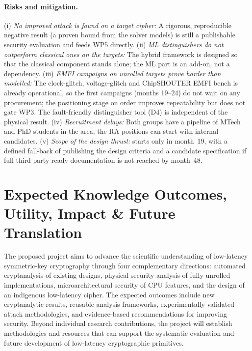 \paragraph{Risks and mitigation.}
(i) \emph{No improved attack is found on a target cipher:}
A rigorous, reproducible negative result (a proven bound from the solver models) is still a publishable security evaluation and feeds WP5 directly.
(ii) \emph{ML distinguishers do not outperform classical ones on the targets:}
The hybrid framework is designed so that the classical component stands alone; the ML part is an add-on, not a dependency.
(iii) \emph{EMFI campaigns on unrolled targets prove harder than modelled:}
The clock-glitch, voltage-glitch and ChipSHOUTER EMFI bench is already operational, so the first campaigns (months 19--24) do not wait on any procurement; the positioning stage on order improves repeatability but does not gate WP3. The fault-friendly distinguisher tool (D4) is independent of the physical result.
(iv) \emph{Recruitment delays:}
Both groups have a pipeline of MTech and PhD students in the area; the RA positions can start with internal candidates.
(v) \emph{Scope of the design thrust:}
 starts only in month~19, with a defined fall-back of publishing the design criteria and a candidate specification if full third-party-ready documentation is not reached by month~48.

\section{Expected Knowledge Outcomes, Utility, Impact \& Future Translation}
The proposed project aims to advance the scientific understanding of low-latency symmetric-key cryptography through four complementary directions: automated cryptanalysis of existing designs, physical security analysis of fully unrolled implementations, microarchitectural security of CPU features, and the design of an indigenous low-latency cipher.
The expected outcomes include new cryptanalytic results, reusable analysis frameworks, experimentally validated attack methodologies, and evidence-based recommendations for improving security.
Beyond individual research contributions, the project will establish methodologies and resources that can support the systematic evaluation and future development of low-latency cryptographic primitives.

